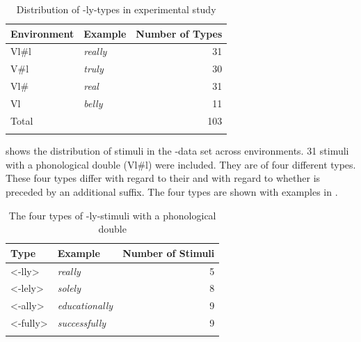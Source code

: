 \begin{table}[b!]
	\caption{Distribution of -ly-types in experimental study}
	\label{tbl:distribution of ly types in experiment}
	
	
		\begin{tabular} {llr}
\lsptoprule			
			Environment & Example & Number of  Types\\
			\midrule
			Vl\#l &\color{lsMidBlue}\textit{really} & 31 \\ 
			V\#l &\color{lsMidBlue}\textit{truly} & 30 \\ 
			Vl\# &\color{lsMidBlue}\textit{real} & 31\\ 
			Vl &\color{lsMidBlue}\textit{belly} & 11\\ 
			\midrule   	
			Total&  & 103 \\ 
			\lspbottomrule                                                                                
		\end{tabular}
	
\end{table}




 shows the distribution of  stimuli in the -data set across environments. 
31 stimuli with a phonological double (Vl\#l) were included. 
They are of four different types. These four types differ with regard to their  and with regard to whether  is preceded by an additional suffix. The four types are shown with examples in .




\begin{table}[b!]
	\caption{The four types of -ly-stimuli with a phonological double}
	\label{tbl:The four types of ly-stimuli with a phonological double}
	
	
		\begin{tabular} {llr}
\lsptoprule			
			Type & Example & Number of  Stimuli\\
			
			\midrule
			<-lly>&\color{lsMidBlue}\textit{really} & 5 \\ 
			<-lely>  \phantom{hggzujg}&\color{lsMidBlue}\textit{solely} & 8\\ 
			<-ally>&\color{lsMidBlue}\textit{educationally} &9\\ 
			<-fully>&\color{lsMidBlue}\textit{successfully} & 9 \\ 
			\lspbottomrule                                                                                
		\end{tabular}
	
\end{table}


